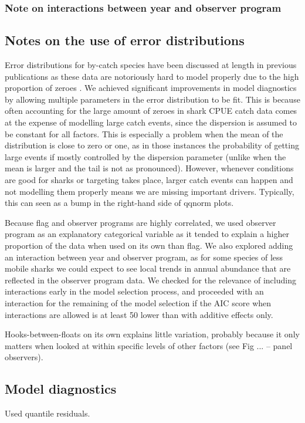 \documentclass{SCreport}
\begin{document}
\subsubsection{Note on interactions between year and observer program}

\subsection{Notes on the use of error distributions} Error distributions for by-catch species have been discussed at length in previous publications as these data are notoriously hard to model properly due to the high proportion of zeroes \citep{...}. We achieved significant improvements in model diagnostics by allowing multiple parameters in the error distribution to be fit. This is because often accounting for the large amount of zeroes in shark CPUE catch data comes at the expense of modelling large catch events, since the dispersion is assumed to be constant for all factors. This is especially a problem when the mean of the distribution is close to zero or one, as in those instances the probability of getting large events if mostly controlled by the dispersion parameter (unlike when the mean is larger and the tail is not as pronounced). However, whenever conditions are good for sharks or targeting takes place, larger catch events can happen and not modelling them properly means we are missing important drivers. Typically, this can seen as a bump in the right-hand side of qqnorm plots.

Because flag and observer programs are highly correlated, we used
observer program as an explanatory categorical variable as it tended
to explain a higher proportion of the data when used on its own than
flag. We also explored adding an interaction between year and observer
program, as for some species of less mobile sharks we could expect to
see local trends in annual abundance that are reflected in the
observer program data. We checked for the relevance of including
interactions early in the model selection process, and proceeded with
an interaction for the remaining of the model selection if the AIC
score when interactions are allowed is at least 50 lower than with
additive effects only.

Hooks-between-floats on its own explains little variation, probably
because it only matters when looked at within specific levels of
other factors (see Fig ... -- panel observers).

\subsection{Model diagnostics}
Used quantile residuals. 

\makosouthaic
\makonorthaic
\blueaic
\ocsaic
\silkyaic
\end{document}
